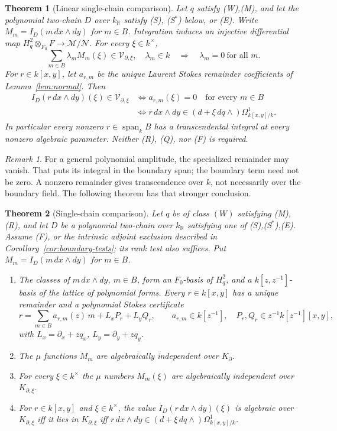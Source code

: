 \documentclass[11pt]{article}
\numberwithin{equation}{section}
\newtheorem{theorem}{Theorem}[section]
\theoremstyle{definition}
\theoremstyle{remark}
\newtheorem{remark}[remark]{Remark}
\newcommand{\R}{\mathbb R}
\newcommand{\Span}{\operatorname{span}}
\newcommand{\Vcal}{\mathcal V}
\newcommand{\dd}{\,d}
\newcommand{\Hq}{H_q^2}
\newcommand{\M}{\mathscr M}
\newcommand{\Ncal}{\mathcal N}
\begin{document}
\begin{theorem}[Linear single-chain comparison]\label{thm:linear}
Let $q$ satisfy (W),(M), and let the polynomial two-chain $D$ over
$k_\R$ satisfy (S), (S$^*$) below, or (E).
Write $M_m=I_D(m\,dx\wedge dy)$ for $m\in B$.
Integration induces an injective differential map
$\Hq\otimes_{F_0}F\longrightarrow\M/\Ncal$.
For every $\xi\in k^\times$,
\[
 \sum_{m\in B}\lambda_m M_m(\xi)\in\Vcal_{\partial,\xi},
 \quad\lambda_m\in k
 \quad\Longrightarrow\quad \lambda_m=0\ \text{for all }m.
\]
For $r\in k[x,y]$, let $a_{r,m}$ be the unique Laurent Stokes remainder
coefficients of Lemma~\ref{lem:normal}. Then
\begin{align*}
 I_D(r\,dx\wedge dy)(\xi)\in\Vcal_{\partial,\xi}
 &\Longleftrightarrow a_{r,m}(\xi)=0\quad\text{for every }m\in B\\
 &\Longleftrightarrow
 r\,dx\wedge dy\in(d+\xi\,dq\wedge)\Omega^1_{k[x,y]/k}.
\end{align*}
In particular every nonzero $r\in\Span_k B$ has a transcendental integral
at every nonzero algebraic parameter. Neither (R), (Q), nor (F) is required.
\end{theorem}

\begin{remark}\label{rem:two-levels}
For a general polynomial amplitude, the specialized remainder may vanish.
That puts its integral in the boundary span; the boundary term need not be
zero. A nonzero remainder gives transcendence over $k$, not necessarily over
the boundary field. The following theorem has that stronger conclusion.
\end{remark}

\begin{theorem}[Single-chain comparison]\label{thm:main}
Let $q$ be of class $(W)$ satisfying \textup{(M),(R)}, and let $D$
be a polynomial two-chain over $k_\R$ satisfying one of
\textup{(S),(S$^*$),(E)}. Assume \textup{(F)}, or the intrinsic adjoint
exclusion described in Corollary~\ref{cor:boundary-tests}; its rank test also
suffices. Put
$M_m=I_D(m\dd x\wedge dy)$ for $m\in B$.
\begin{enumerate}[label=\textup{(\roman*)},leftmargin=2.4em]
\item The classes of $m\,dx\wedge dy$, $m\in B$, form an $F_0$-basis of $\Hq$,
 and a $k[z,z^{-1}]$-basis of the lattice of polynomial forms. Every
 $r\in k[x,y]$ has a unique remainder and a polynomial Stokes certificate
 \[
  r=\sum_{m\in B}a_{r,m}(z)\,m+L_xP_r+L_yQ_r,\qquad a_{r,m}\in k[z^{-1}],\quad
  P_r,Q_r\in z^{-1}k[z^{-1}][x,y],
 \]
 with $L_x=\partial_x+zq_x$, $L_y=\partial_y+zq_y$.
\item The $\mu$ functions $M_m$ are algebraically independent over $K_\partial$.
\item For every $\xi\in k^\times$ the $\mu$ numbers $M_m(\xi)$ are algebraically
 independent over $K_{\partial,\xi}$.
\item For $r\in k[x,y]$ and $\xi\in k^\times$, the value $I_D(r\dd x\wedge dy)(\xi)$
 is algebraic over $K_{\partial,\xi}$ iff it lies in $K_{\partial,\xi}$ iff
 $r\,dx\wedge dy\in(d+\xi\,dq\wedge)\Omega^1_{k[x,y]/k}$.
\end{enumerate}
\end{theorem}
\end{document}
